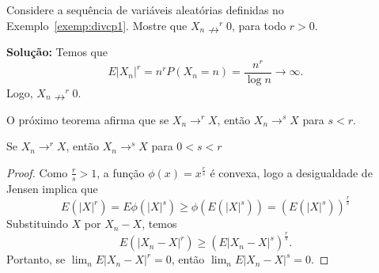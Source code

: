 %
\begin{frame}
%
%
\begin{exem}
Considere a sequência de variáveis aleatórias definidas no Exemplo~\ref{exemp:divcp1}. Mostre que $X_n\nrightarrow^r 0$, para todo $r>0$.

{\bf Solução:} Temos que
$$E|X_n|^r=n^rP(X_n=n)=\frac{n^r}{\log n}\rightarrow\infty.$$
Logo, $X_n\nrightarrow^r 0$.
\end{exem}
%
%
%
%
O próximo teorema afirma que se $X_n\rightarrow^r X$, então $X_n\rightarrow^s X$ para $s<r$.
%
\begin{teo}
Se $X_n\rightarrow^r X$, então $X_n\rightarrow^s X$ para $0<s<r$
\end{teo}
%
%
%
%
\begin{proof}
Como $\frac{r}{s}>1$, a função $\phi(x)=x^{\frac{r}{s}}$ é convexa, logo a desigualdade de Jensen implica que
$$E(|X|^r)=E\phi(|X|^s)\geq \phi(E(|X|^s))=(E(|X|^s))^{\frac{r}{s}}$$
Substituindo $X$ por $X_n-X$, temos
$$E(|X_n-X|^{r})\geq (E|X_n-X|^{s})^{\frac{r}{s}}.$$
Portanto, se $\lim_n E|X_n-X|^{r}=0$, então $\lim_n E|X_n-X|^{s}=0$.
\end{proof}
%
\end{frame}
%

